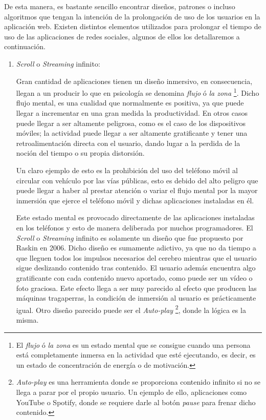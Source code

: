 \vspace{0.3cm}

De esta manera, es bastante sencillo encontrar diseños, patrones o incluso algoritmos que tengan la intención de la prolongación de uso de los usuarios en la aplicación web. Existen distintos elementos utilizados para prolongar el tiempo de uso de las aplicaciones de redes sociales, algunos de ellos los detallaremos a continuación. \cite{Adiccion-RRSS-Features}

\begin{enumerate}

    \item
    \textit{Scroll} o \textit{Streaming} infinito:
    
    Gran cantidad de aplicaciones tienen un diseño inmersivo, en consecuencia, llegan a un producir lo que en psicología se denomina \textit{flujo} ó \textit{la zona} \footnote{El \textit{flujo} ó \textit{la zona} es un estado mental que se consigue cuando una persona está completamente inmersa en la actividad que esté ejecutando, es decir, es un estado de concentración de energía o de motivación.}. Dicho flujo mental, es una cualidad que normalmente es positiva, ya que puede llegar a incrementar en una gran medida la productividad. En otros casos puede llegar a ser altamente peligrosa, como es el caso de los dispositivos móviles; la actividad puede llegar a ser altamente gratificante y tener una retroalimentación directa con el usuario, dando lugar a la perdida de la noción del tiempo o su propia distorsión.
    
    Un claro ejemplo de esto es la prohibición del uso del teléfono móvil al circular con vehículo por las vías públicas, esto es debido del alto peligro que puede llegar a haber al prestar atención o variar el flujo mental por la mayor inmersión que ejerce el teléfono móvil y dichas aplicaciones instaladas en él.

    Este estado mental es provocado directamente de las aplicaciones instaladas en los teléfonos y esto de manera deliberada por muchos programadores. El \textit{Scroll} o \textit{Streaming} infinito es solamente un diseño que fue propuesto por Raskin en 2006. Dicho diseño es sumamente adictivo, ya que no da tiempo a que lleguen todos los impulsos necesarios del cerebro mientras que el usuario sigue deslizando contenido tras contenido. El usuario además encuentra algo gratificante con cada contenido nuevo aportado, como puede ser un vídeo o foto graciosa. Este efecto llega a ser muy parecido al efecto que producen las máquinas tragaperras, la condición de inmersión al usuario es prácticamente igual. Otro diseño parecido puede ser el \textit{Auto-play} \footnote{\textit{Auto-play} es una herramienta donde se proporciona contenido infinito si no se llega a parar por el propio usuario. Un ejemplo de ello, aplicaciones como YouTube o Spotify, donde se requiere darle al botón \textit{pause} para frenar dicho contenido.}, donde la lógica es la misma.


\end{enumerate}
